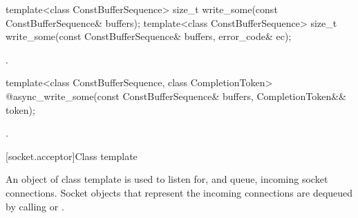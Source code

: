 \begin{itemdecl}
template<class ConstBufferSequence>
  size_t write_some(const ConstBufferSequence& buffers);
template<class ConstBufferSequence>
  size_t write_some(const ConstBufferSequence& buffers,
                    error_code& ec);
\end{itemdecl}

\begin{itemdescr}
\pnum
\returns {}.
\end{itemdescr}

\begin{itemdecl}
template<class ConstBufferSequence, class CompletionToken>
  @\DEDUCED@ async_write_some(const ConstBufferSequence& buffers,
                           CompletionToken&& token);
\end{itemdecl}

\begin{itemdescr}
\pnum
\returns {}.
\end{itemdescr}




%
[socket.acceptor]{Class template }

\pnum
An object of class template  is used to listen for, and queue, incoming socket connections. Socket objects that represent the incoming connections are dequeued by calling  or .

